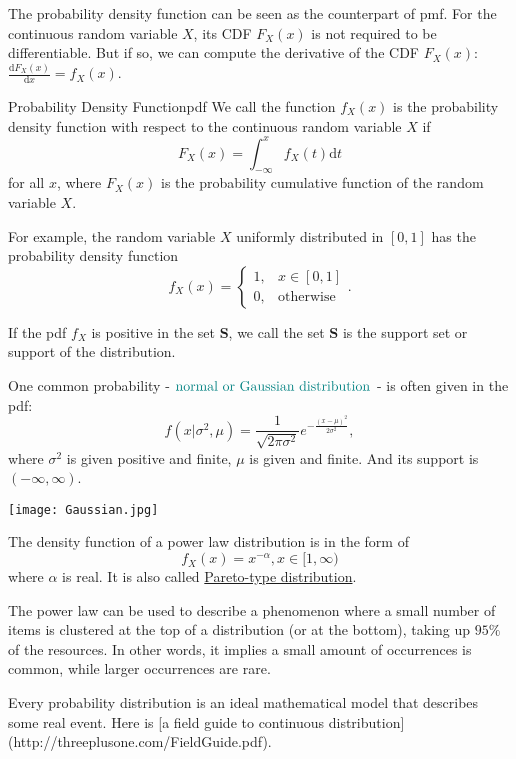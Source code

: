 \documentclass[titlestyle=hang,11pt]{elegantbook}
\begin{document}
The probability density function can be seen as the counterpart of pmf.
For the continuous random variable $X$, its CDF $F_X(x)$ is not required to be differentiable.
But if so, we can compute the derivative of the CDF $F_X(x)$: $\frac{\mathrm{d}F_X(x)}{\mathrm{d}x} = f_X(x)$.

\begin{definition}{Probability Density Function}{pdf}
We call the function $f_X(x)$ is the probability density function with respect to the continuous random variable $X$ if
\[ F_X(x) = \int_{-\infty}^{x}f_X(t)\mathrm{d}t \]
for all $x$, where $F_X(x)$ is the probability cumulative function of the random variable $X$.
\end{definition}

For example, the random variable $X$ uniformly distributed in $[0, 1]$ has the probability density function
\[ f_X(x)=\begin{cases} 1, & \text{$x \in [0, 1]$}\\0, & \text{otherwise}\end{cases}. \]

If the pdf $f_X$ is positive in the set $\mathbf{S}$, we call the set $\mathbf{S}$ is the support set or support of the distribution.

One common probability - $\color{teal}{\text{normal or Gaussian distribution}}$ - is often given in the pdf:
\[ f(x|\sigma^2, \mu)=\frac{1}{\sqrt{2\pi\sigma^2}}e^{-\frac{(x-\mu)^2}{2\sigma^2}}, \]
where $\sigma^2$ is given positive and finite, $\mu$ is given and finite. And its support is $(-\infty,\infty)$.
\begin{center}
\texttt{[image: Gaussian.jpg]}
\end{center}

The density function of a power law distribution is in the form of
\[ f_X(x)= x^{-\alpha}, x\in [1,\infty) \]
where  $\alpha$ is real. It is also called \href{https://www.wikiwand.com/en/Pareto_distribution}{Pareto-type distribution}.

The power law can be used to describe a phenomenon where a small number of items is clustered at the top of a distribution (or at the bottom), taking up $95\%$ of the resources. In other words, it implies a small amount of occurrences is common, while larger occurrences are rare.

Every probability distribution is an ideal mathematical model that describes some real event.
Here is [a field guide to continuous distribution](http://threeplusone.com/FieldGuide.pdf).
\end{document}
